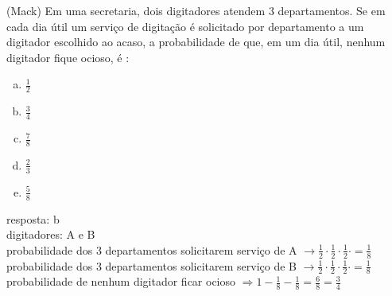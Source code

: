 \begin{ex}
   (Mack) Em uma secretaria, dois digitadores atendem 3 departamentos. Se em cada dia útil um serviço de digitação é solicitado por departamento a um digitador escolhido ao acaso, a probabilidade de que, em um dia útil, nenhum digitador fique ocioso, é :
     \begin{enumerate} [(a)]
         \item $\frac{1}{2}$
         \item $\frac{3}{4}$
         \item $\frac{7}{8}$
         \item $\frac{2}{3}$
         \item $\frac{5}{8}$
     \end{enumerate}
       \begin{sol}
        resposta: b \\
        digitadores: A e B\\
        probabilidade dos 3 departamentos solicitarem serviço de A  $\rightarrow \frac{1}{2}\cdot\frac{1}{2}\cdot\frac{1}{2}\cdot = \frac{1}{8}$   \\
       probabilidade dos 3 departamentos solicitarem serviço de B $\rightarrow \frac{1}{2}\cdot\frac{1}{2}\cdot\frac{1}{2}\cdot = \frac{1}{8}$  \\
       probabilidade de nenhum digitador ficar ocioso $\Longrightarrow 1-\frac{1}{8}-\frac{1}{8}=\frac{6}{8}=\frac{3}{4}$
        \end{sol}
  \end{ex}